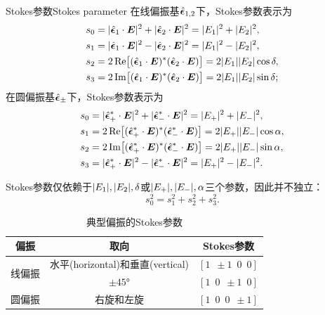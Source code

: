 \begin{definition}
    {Stokes参数}{Stokes parameter}
    在线偏振基$\mathop{}\!\hat{\bm{\epsilon}}_{1,2}$下，Stokes参数表示为
    \begin{subequations}
        \begin{align}
            s_0 &= \abs{\uvec\epsilon_1 \cdot \bm E}^2 + \abs{\uvec\epsilon_2 \cdot \bm E}^2 = \abs{E_1}^2 + \abs{E_2}^2,\\
            s_1 &= \abs{\uvec\epsilon_1 \cdot \bm E}^2 - \abs{\uvec\epsilon_2 \cdot \bm E}^2 = \abs{E_1}^2 - \abs{E_2}^2,\\
            s_2 &= 2\Re\bigb{(\uvec\epsilon_1 \cdot \bm E)\conj(\uvec\epsilon_2 \cdot \bm E)} = 2\abs{E_1}\abs{E_2}\cos\delta,\\
            s_3 &= 2\Im\bigb{(\uvec\epsilon_1 \cdot \bm E)\conj(\uvec\epsilon_2 \cdot \bm E)} = 2\abs{E_1}\abs{E_2}\sin\delta;
        \end{align}
    \end{subequations}
    在圆偏振基$\mathop{}\!\hat{\bm{\epsilon}}_\pm$下，Stokes参数表示为
    \begin{subequations}
        \begin{align}
            s_0 &= \abs{\uvec\epsilon_+\conj \cdot \bm E}^2 + \abs{\uvec\epsilon_-\conj \cdot \bm E}^2 = \abs{E_+}^2 + \abs{E_-}^2,\\
            s_1 &= 2\Re\bigb{(\uvec\epsilon_+\conj \cdot \bm E)\conj(\uvec\epsilon_-\conj \cdot \bm E)} = 2\abs{E_+}\abs{E_-}\cos\alpha,\\
            s_2 &= 2\Im\bigb{(\uvec\epsilon_+\conj \cdot \bm E)\conj(\uvec\epsilon_-\conj \cdot \bm E)} = 2\abs{E_+}\abs{E_-}\sin\alpha,\\
            s_3 &= \abs{\uvec\epsilon_+\conj \cdot \bm E}^2 - \abs{\uvec\epsilon_-\conj \cdot \bm E}^2 = \abs{E_+}^2 - \abs{E_-}^2.
        \end{align}
    \end{subequations}
\end{definition}
\begin{corollary}
    Stokes参数仅依赖于$\lvert E_1\rvert,\lvert E_2\rvert,\delta$或$\lvert E_+\rvert,\lvert E_-\rvert,\alpha$三个参数，因此并不独立：
    \begin{equation}
        \label{eq:ed-pure-stokes-constraint}
        s_0^2 = s_1^2 + s_2^2 + s_3^2.
    \end{equation}
\end{corollary}

\begin{table}[h]
    \centering
    \caption{典型偏振的Stokes参数}
    \begin{tabular}{ccc}
        \toprule
        偏振 & 取向 & Stokes参数\\
        \midrule
        \multirow{2}{*}{线偏振} & 水平(horizontal)和垂直(vertical) & $[1\enspace \pm 1\enspace0\enspace0]$ \\
         & $\pm\ang{45}$ & $[1\enspace0\enspace \pm 1\enspace0]$ \\
        圆偏振 & 右旋和左旋 & $[1\enspace0\enspace0\enspace \pm 1]$ \\
        \bottomrule
    \end{tabular}
    \label{tab:Stokes parameters}
\end{table}

